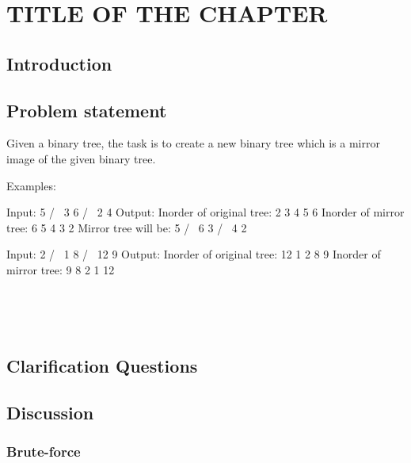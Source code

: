 %

\chapter{TITLE OF THE CHAPTER}
\label{ch:mirror_binary_tree}
\section*{Introduction}

\section{Problem statement}
\begin{exercise}
	Given a binary tree, the task is to create a new binary tree which is a mirror image of the given binary tree.

	Examples:
	
	Input:
			5
		   / \
		  3   6
		 / \
		2   4
	Output:
	Inorder of original tree: 2 3 4 5 6 
	Inorder of mirror tree: 6 5 4 3 2
	Mirror tree will be:
	  5
	 / \
	6   3
	   / \
	  4   2
	
	Input:
			2
		   / \
		  1   8
		 /     \
		12      9
	Output:
	Inorder of original tree: 12 1 2 8 9 
	Inorder of mirror tree: 9 8 2 1 12 
	\begin{example}
		\hfill \
		
	\end{example}

	\begin{example}
		\hfill \
		
	\end{example}
\end{exercise}

\section{Clarification Questions}

\begin{QandA}
	\item 
	\begin{answered}
		\textit{}
	\end{answered}
	
\end{QandA}

\section{Discussion}
\label{mirror_binary_tree:sec:discussion}


\subsection{Brute-force}
\label{mirror_binary_tree:sec:bruteforce}



